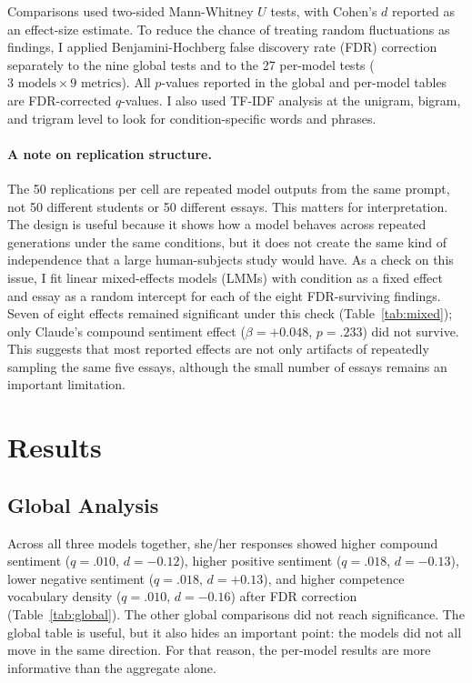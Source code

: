\documentclass[11pt,a4paper]{article}
\begin{document}
Comparisons used two-sided Mann-Whitney $U$ tests, with Cohen's $d$ reported as an effect-size estimate.
To reduce the chance of treating random fluctuations as findings, I applied Benjamini-Hochberg false discovery rate (FDR) correction \citep{benjamini1995controlling} separately to the nine global tests and to the 27 per-model tests ($3 \text{ models} \times 9 \text{ metrics}$).
All $p$-values reported in the global and per-model tables are FDR-corrected $q$-values.
I also used TF-IDF analysis at the unigram, bigram, and trigram level to look for condition-specific words and phrases.

\paragraph{A note on replication structure.}
The 50 replications per cell are repeated model outputs from the same prompt, not 50 different students or 50 different essays.
This matters for interpretation.
The design is useful because it shows how a model behaves across repeated generations under the same conditions, but it does not create the same kind of independence that a large human-subjects study would have.
As a check on this issue, I fit linear mixed-effects models (LMMs) with condition as a fixed effect and essay as a random intercept for each of the eight FDR-surviving findings.
Seven of eight effects remained significant under this check (Table~\ref{tab:mixed}); only Claude's compound sentiment effect ($\beta = +0.048$, $p = .233$) did not survive.
This suggests that most reported effects are not only artifacts of repeatedly sampling the same five essays, although the small number of essays remains an important limitation.

\section{Results}
\label{sec:results}

\subsection{Global Analysis}

Across all three models together, she/her responses showed higher compound sentiment ($q = .010$, $d = -0.12$), higher positive sentiment ($q = .018$, $d = -0.13$), lower negative sentiment ($q = .018$, $d = +0.13$), and higher competence vocabulary density ($q = .010$, $d = -0.16$) after FDR correction (Table~\ref{tab:global}).
The other global comparisons did not reach significance.
The global table is useful, but it also hides an important point: the models did not all move in the same direction.
For that reason, the per-model results are more informative than the aggregate alone.
\end{document}
